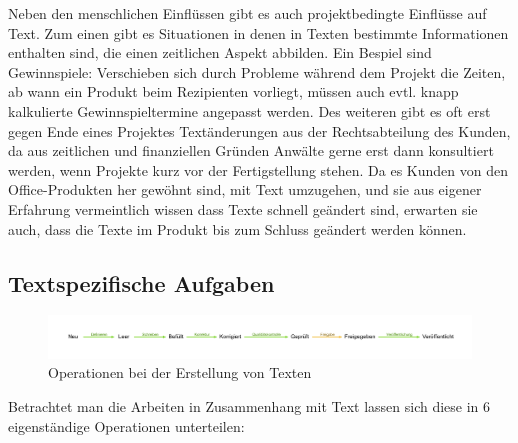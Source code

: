 Neben den menschlichen Einflüssen gibt es auch projektbedingte Einflüsse auf Text. Zum einen gibt es Situationen in denen in Texten bestimmte Informationen enthalten sind, die einen zeitlichen Aspekt abbilden. Ein Bespiel sind Gewinnspiele: Verschieben sich durch Probleme während dem Projekt die Zeiten, ab wann ein Produkt beim Rezipienten vorliegt, müssen auch evtl. knapp kalkulierte Gewinnspieltermine angepasst werden. Des weiteren gibt es oft erst gegen Ende eines Projektes Textänderungen aus der Rechtsabteilung des Kunden, da aus zeitlichen und finanziellen Gründen Anwälte gerne erst dann konsultiert werden, wenn Projekte kurz vor der Fertigstellung stehen. Da es Kunden von den Office-Produkten her gewöhnt sind, mit Text umzugehen, und sie aus eigener Erfahrung vermeintlich wissen dass Texte schnell geändert sind, erwarten sie auch, dass die Texte im Produkt bis zum Schluss geändert werden können.

\subsection{Textspezifische Aufgaben}

\begin{figure}[htb]
\begin{center}
\includegraphics[width=\textwidth]{media/chart-3.pdf}
\end{center}
\caption{Operationen bei der Erstellung von Texten}
\label{chart:3}
\end{figure}

Betrachtet man die Arbeiten in Zusammenhang mit Text lassen sich diese in 6 eigenständige Operationen unterteilen:

